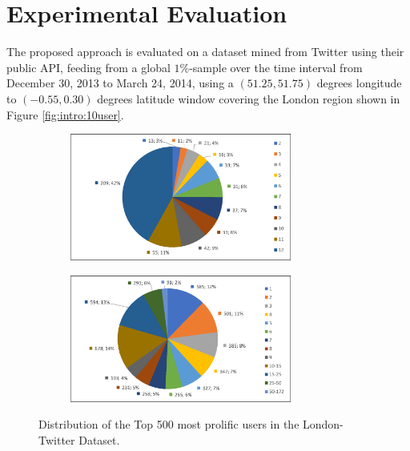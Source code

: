 
\chapter[Experimental Evaluation]{Experimental Evaluation}
\label{sec:experiments}

The proposed approach is evaluated on a dataset mined from Twitter using their public API, feeding from a global $1\%$-sample over the time interval from December 30, 2013 to March 24, 2014, using a $(51.25,51.75)$ degrees longitude to $(-0.55,0.30)$ degrees latitude window covering the London region shown in Figure \ref{fig:intro:10user}.

\begin{figure}[ph]
	\centering
	\begin{subfigure}[b]{\textwidth}
		\centering
		\includegraphics[width = 0.8\textwidth]{figures/500_trajectories_per_user}
    \label{fig:500_traj}
	\end{subfigure}

	\begin{subfigure}[b]{\textwidth}
		\centering
		\includegraphics[width = 0.8\textwidth]{figures/500_observations_per_trajectory}
    \label{fig:500_obs}
	\end{subfigure}
  \caption{Distribution of the Top 500 most prolific users in the London-Twitter Dataset.}\vspace{-0.2cm}
  \label{fig:500_dist}
	\figSpace
\end{figure}

